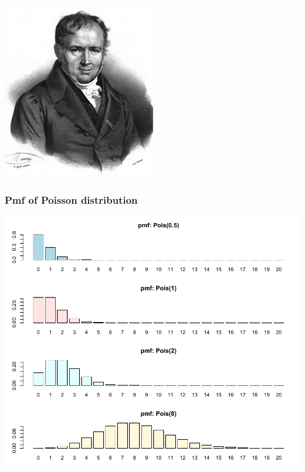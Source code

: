 \documentclass[slidestop,compress,mathserif]{beamer}
\begin{document}
\begin{frame}
{\begin{center}
\includegraphics[width = \textwidth]{figures/Simeon_Denis_Poisson}
\end{center}
}

\end{frame}





\begin{frame}\frametitle{Pmf of Poisson distribution}

\vspace{-0.5cm}
\begin{center}
\includegraphics[scale = 0.6]{figures/pmf3}
\end{center}

\end{frame}
\end{document}
